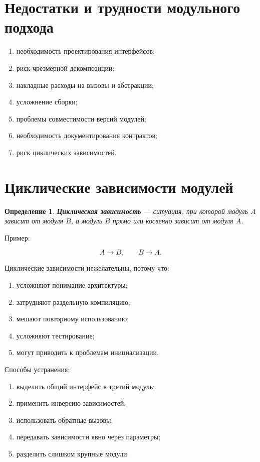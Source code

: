 \documentclass[12pt,a4paper]{article}
\newtheorem{definition}{Определение}
\begin{document}
\section{Недостатки и трудности модульного подхода}

\begin{enumerate}
  \item необходимость проектирования интерфейсов;
  \item риск чрезмерной декомпозиции;
  \item накладные расходы на вызовы и абстракции;
  \item усложнение сборки;
  \item проблемы совместимости версий модулей;
  \item необходимость документирования контрактов;
  \item риск циклических зависимостей.
\end{enumerate}

\section{Циклические зависимости модулей}

\begin{definition}
\textbf{Циклическая зависимость} --- ситуация, при которой модуль $A$ зависит от модуля $B$, а модуль $B$ прямо или косвенно зависит от модуля $A$.
\end{definition}

Пример:

\[
A \rightarrow B,\qquad B \rightarrow A.
\]

Циклические зависимости нежелательны, потому что:
\begin{enumerate}
  \item усложняют понимание архитектуры;
  \item затрудняют раздельную компиляцию;
  \item мешают повторному использованию;
  \item усложняют тестирование;
  \item могут приводить к проблемам инициализации.
\end{enumerate}

Способы устранения:
\begin{enumerate}
  \item выделить общий интерфейс в третий модуль;
  \item применить инверсию зависимостей;
  \item использовать обратные вызовы;
  \item передавать зависимости явно через параметры;
  \item разделить слишком крупные модули.
\end{enumerate}
\end{document}
